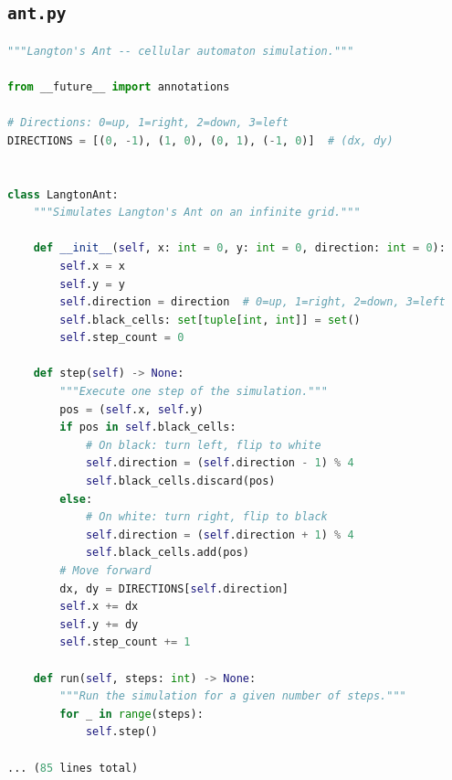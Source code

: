 \documentclass[11pt,a4paper]{article}
\begin{document}
\subsection*{\texttt{ant.py}}
\begin{lstlisting}[language=Python]
"""Langton's Ant -- cellular automaton simulation."""

from __future__ import annotations

# Directions: 0=up, 1=right, 2=down, 3=left
DIRECTIONS = [(0, -1), (1, 0), (0, 1), (-1, 0)]  # (dx, dy)


class LangtonAnt:
    """Simulates Langton's Ant on an infinite grid."""

    def __init__(self, x: int = 0, y: int = 0, direction: int = 0):
        self.x = x
        self.y = y
        self.direction = direction  # 0=up, 1=right, 2=down, 3=left
        self.black_cells: set[tuple[int, int]] = set()
        self.step_count = 0

    def step(self) -> None:
        """Execute one step of the simulation."""
        pos = (self.x, self.y)
        if pos in self.black_cells:
            # On black: turn left, flip to white
            self.direction = (self.direction - 1) % 4
            self.black_cells.discard(pos)
        else:
            # On white: turn right, flip to black
            self.direction = (self.direction + 1) % 4
            self.black_cells.add(pos)
        # Move forward
        dx, dy = DIRECTIONS[self.direction]
        self.x += dx
        self.y += dy
        self.step_count += 1

    def run(self, steps: int) -> None:
        """Run the simulation for a given number of steps."""
        for _ in range(steps):
            self.step()

... (85 lines total)
\end{lstlisting}
\end{document}
